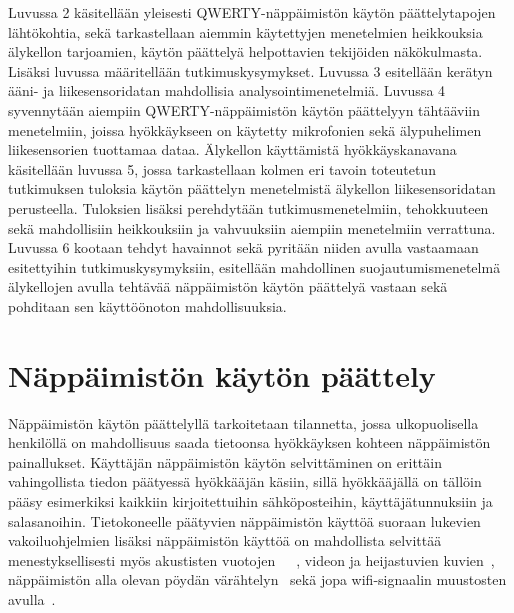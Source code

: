 \documentclass[finnish]{tktltiki2}
\theoremstyle{definition}
\theoremstyle{remark}
\begin{document}
Luvussa 2 käsitellään yleisesti QWERTY-näppäimistön käytön päättelytapojen lähtökohtia, sekä tarkastellaan aiemmin käytettyjen menetelmien heikkouksia älykellon tarjoamien, käytön päättelyä helpottavien tekijöiden näkökulmasta. Lisäksi luvussa määritellään tutkimuskysymykset. Luvussa 3 esitellään kerätyn ääni- ja liikesensoridatan mahdollisia analysointimenetelmiä. Luvussa 4 syvennytään aiempiin QWERTY-näppäimistön käytön päättelyyn tähtääviin menetelmiin, joissa hyökkäykseen on käytetty mikrofonien sekä älypuhelimen liikesensorien tuottamaa dataa. Älykellon käyttämistä hyökkäyskanavana käsitellään luvussa 5, jossa tarkastellaan kolmen eri tavoin toteutetun tutkimuksen tuloksia käytön päättelyn menetelmistä älykellon liikesensoridatan perusteella. Tuloksien lisäksi perehdytään tutkimusmenetelmiin, tehokkuuteen sekä  mahdollisiin heikkouksiin ja vahvuuksiin aiempiin menetelmiin verrattuna. Luvussa 6 kootaan tehdyt havainnot sekä pyritään niiden avulla vastaamaan esitettyihin tutkimuskysymyksiin, esitellään mahdollinen suojautumismenetelmä älykellojen avulla tehtävää näppäimistön käytön päättelyä vastaan sekä pohditaan sen käyttöönoton mahdollisuuksia. 


\pagebreak
\section{Näppäimistön käytön päättely}
Näppäimistön käytön päättelyllä tarkoitetaan tilannetta, jossa ulkopuolisella henkilöllä on mahdollisuus saada tietoonsa hyökkäyksen kohteen näppäimistön painallukset.
Käyttäjän näppäimistön käytön selvittäminen on erittäin vahingollista tiedon päätyessä hyökkääjän käsiin, sillä hyökkääjällä on tällöin pääsy esimerkiksi kaikkiin kirjoitettuihin sähköposteihin, käyttäjätunnuksiin ja salasanoihin. Tietokoneelle päätyvien näppäimistön käyttöä suoraan lukevien vakoiluohjelmien lisäksi näppäimistön käyttöä on mahdollista selvittää menestyksellisesti myös akustisten vuotojen~\cite{berger}~\cite{zhu}~\cite{aso}, videon ja heijastuvien kuvien~\cite{balz}, näppäimistön alla olevan pöydän värähtelyn~\cite{mar} sekä jopa wifi-signaalin muustosten avulla~\cite{ali}.
\end{document}
